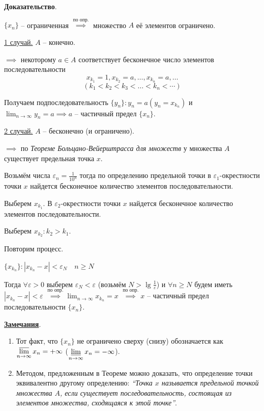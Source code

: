 \documentclass{article}
\newcommand{\bydef}{\stackrel{\text{по опр.}}{\implies}} %
\newcommand{\parspace}{\vspace{10pt}}
\newcommand{\dslim}{\displaystyle\lim}
\newcommand{\dslimn}{\dslim_{n \to \infty}}
\theoremstyle{break}
\begin{document}
\textbf{Доказательство}.

$\{x_n\}$ -- ограниченная $\bydef$ множество $A$ её
элементов ограничено.

\underline{1 случай.} $A$ -- конечно.

$\implies$ некоторому $a \in A$ соответствует бесконечное число элементов последовательности 
\[x_{k_1} = 1, x_{k_2} = a, \dots, x_{k_n} = a, \dots\]
\[(k_1 < k_2 < k_3 < \dots < k_n < \cdots)\]

Получаем подпоследовательность $\{y_n\}: y_n = a (y_n = x_{k_n})$ и
$\dslimn y_n = a \implies a$ -- частичный предел $\{x_n\}$.

\underline{2 случай.} $A$ -- бесконечно (и ограничено).

$\implies$ по \textit{Теореме Больцано-Вейерштрасса для множеств} у множества $A$
существует предельная точка $x$.

Возьмём числа $\varepsilon_n = \frac{1}{10^n}$ тогда по определению предельной точки
в $\varepsilon_1$-окрестности точки $x$ найдется бесконечное количество элементов последовательности.

Выберем $x_{k_1}$. В $\varepsilon_2$-окрестности точки $x$ найдется бесконечное
количество элементов последовательности.

Выберем $x_{k_2}: k_2 > k_1$.

Повторим процесс.

$\{x_{k_n}\}: \left| x_{k_n} - x \right| < \varepsilon_N \quad n \ge N$

Тогда $\forall \varepsilon > 0$ выберем $\varepsilon_N < \varepsilon$
(возьмём $N > \lg \frac{1}{\varepsilon}$) и $\forall n \ge N$ будем иметь 
$\left| x_{k_n} - x \right| < \varepsilon$ 
$\bydef \dslimn x_{k_n} = x$
$\bydef x$ -- частичный предел последовательности $\{x_n\}$.

\parspace

\underline{\textbf{Замечания}}.
\begin{enumerate}
    \item Тот факт, что $\{x_n\}$ не ограничено сверху (снизу) обозначается как 
    $\displaystyle\varlimsup_{n \to \infty} x_n = +\infty$ 
    ($\displaystyle\varliminf_{n \to \infty} x_n = -\infty$).

    \item Методом, предложенным в Теореме можно доказать, что определение точки
    эквивалентно другому определению: \textit{``Точка $x$ называется предельной точкой
    множества $A$, если существует последовательность, состоящая из элементов
    множества, сходящаяся к этой точке''}.
\end{enumerate}
\end{document}
